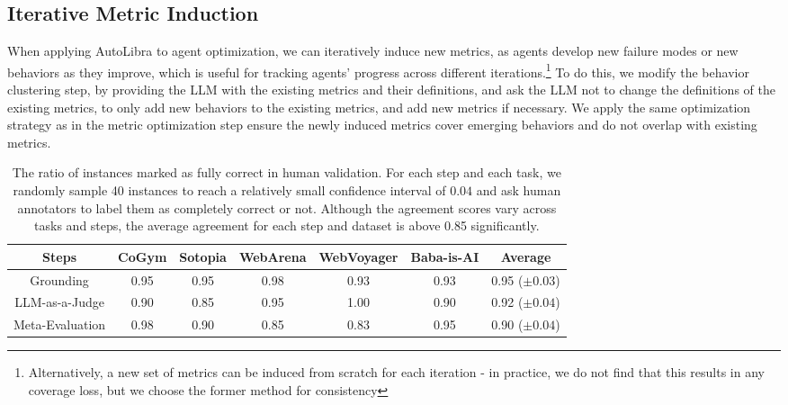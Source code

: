 \subsection{Iterative Metric Induction}
\label{sec:iterative-induction} When applying AutoLibra to agent optimization, we
can iteratively induce new metrics, as agents develop new failure modes or new
behaviors as they improve, which is useful for tracking agents' progress across
different iterations.\footnote{Alternatively, a new set of metrics can be induced
	from scratch for each iteration - in practice, we do not find that this results
	in any coverage loss, but we choose the former method for consistency}
To do this, we modify the behavior clustering step, by providing the LLM with
the existing metrics and their definitions, and ask the LLM not to change the definitions
of the existing metrics, to only add new behaviors to the existing metrics, and add
new metrics if necessary. We apply the same optimization strategy as in the
metric optimization step ensure the newly induced metrics cover emerging
behaviors and do not overlap with existing metrics.\smallskip

\begin{table}[!h]
	\centering
	\small
    \vspace{-20pt}
    	\caption{ The ratio of instances marked as fully correct in human validation.
		For each step and each task, we randomly sample 40 instances to reach a relatively
		small confidence interval of $0.04$ and ask human annotators to label them as completely
		correct or not. Although the agreement scores vary across tasks and steps, the
		average agreement for each step and dataset is above 0.85 significantly. }
	\begin{tabular}{cccccc|c}
		\toprule Steps     & CoGym & Sotopia & WebArena & WebVoyager & Baba-is-AI & Average           \\
		\midrule Grounding & 0.95  & 0.95    & 0.98     & 0.93       & 0.93       & 0.95 ($\pm 0.03$) \\
		LLM-as-a-Judge     & 0.90  & 0.85    & 0.95     & 1.00       & 0.90       & 0.92 ($\pm 0.04$) \\
		Meta-Evaluation    & 0.98  & 0.90    & 0.85     & 0.83       & 0.95       & 0.90 ($\pm 0.04$) \\
		\bottomrule
	\end{tabular}

	\label{tab:validation}
\end{table}

